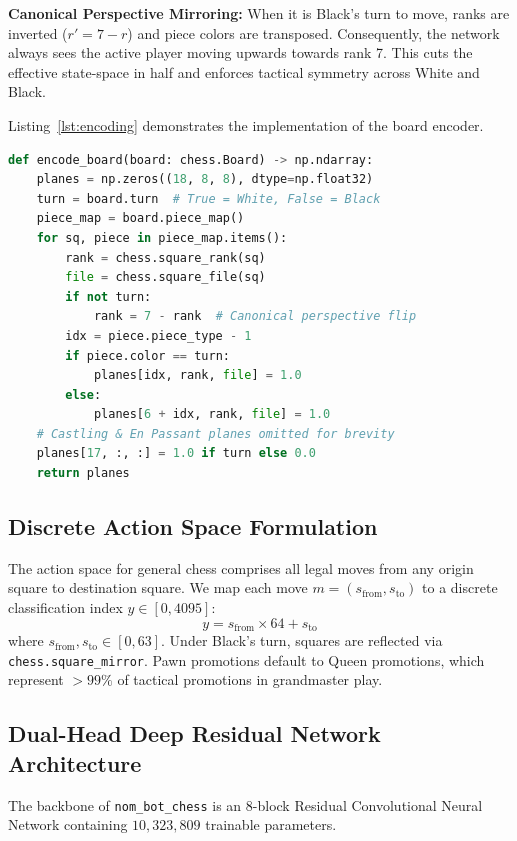 \documentclass[10pt,journal,compsoc]{IEEEtran}
\begin{document}
\textbf{Canonical Perspective Mirroring:} When it is Black's turn to move, ranks are inverted ($r' = 7 - r$) and piece colors are transposed. Consequently, the network always sees the active player moving upwards towards rank 7. This cuts the effective state-space in half and enforces tactical symmetry across White and Black.

Listing~\ref{lst:encoding} demonstrates the implementation of the board encoder.

\begin{lstlisting}[language=Python, caption={Canonical 18-Plane Board Tensor Encoding}, label={lst:encoding}]
def encode_board(board: chess.Board) -> np.ndarray:
    planes = np.zeros((18, 8, 8), dtype=np.float32)
    turn = board.turn  # True = White, False = Black
    piece_map = board.piece_map()
    for sq, piece in piece_map.items():
        rank = chess.square_rank(sq)
        file = chess.square_file(sq)
        if not turn:
            rank = 7 - rank  # Canonical perspective flip
        idx = piece.piece_type - 1
        if piece.color == turn:
            planes[idx, rank, file] = 1.0
        else:
            planes[6 + idx, rank, file] = 1.0
    # Castling & En Passant planes omitted for brevity
    planes[17, :, :] = 1.0 if turn else 0.0
    return planes
\end{lstlisting}

\subsection{Discrete Action Space Formulation}
The action space for general chess comprises all legal moves from any origin square to destination square. We map each move $m = (s_{\text{from}}, s_{\text{to}})$ to a discrete classification index $y \in [0, 4095]$:
\begin{equation}
y = s_{\text{from}} \times 64 + s_{\text{to}}
\end{equation}
where $s_{\text{from}}, s_{\text{to}} \in [0, 63]$. Under Black's turn, squares are reflected via \texttt{chess.square\_mirror}. Pawn promotions default to Queen promotions, which represent $>99\%$ of tactical promotions in grandmaster play.

\subsection{Dual-Head Deep Residual Network Architecture}
The backbone of \texttt{nom\_bot\_chess} is an 8-block Residual Convolutional Neural Network containing $10,323,809$ trainable parameters. 
\end{document}
